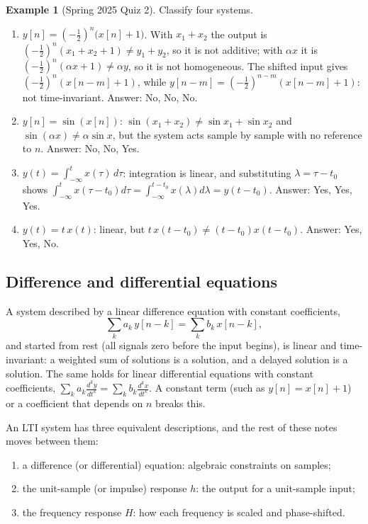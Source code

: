 \documentclass[11pt]{article}
\numberwithin{equation}{section}
\theoremstyle{definition}
\newtheorem{example}{Example}[section]
\theoremstyle{remark}
\begin{document}
\begin{example}[Spring 2025 Quiz 2]
Classify four systems.
\begin{enumerate}[label=(\alph*)]
\item $y[n]=\left(-\frac12\right)^n\big(x[n]+1\big)$. With $x_1+x_2$ the output is
$\left(-\frac12\right)^n(x_1+x_2+1)\neq y_1+y_2$, so it is not additive; with $\alpha x$ it is
$\left(-\frac12\right)^n(\alpha x+1)\neq\alpha y$, so it is not homogeneous. The shifted input gives
$\left(-\frac12\right)^n(x[n-m]+1)$, while $y[n-m]=\left(-\frac12\right)^{n-m}(x[n-m]+1)$:
not time-invariant. Answer: No, No, No.
\item $y[n]=\sin(x[n])$: $\sin(x_1+x_2)\ne\sin x_1+\sin x_2$ and $\sin(\alpha x)\ne\alpha\sin x$,
but the system acts sample by sample with no reference to $n$. Answer: No, No, Yes.
\item $y(t)=\int_{-\infty}^t x(\tau)\,d\tau$: integration is linear, and substituting
$\lambda=\tau-t_0$ shows $\int_{-\infty}^t x(\tau-t_0)d\tau=\int_{-\infty}^{t-t_0}x(\lambda)d\lambda
=y(t-t_0)$. Answer: Yes, Yes, Yes.
\item $y(t)=t\,x(t)$: linear, but $t\,x(t-t_0)\ne(t-t_0)x(t-t_0)$. Answer: Yes, Yes, No.
\end{enumerate}
\end{example}

\subsection{Difference and differential equations}
A system described by a linear difference equation with constant coefficients,
\begin{equation}
\sum_{k}a_k\,y[n-k]=\sum_k b_k\,x[n-k],
\label{eq:diffeq}
\end{equation}
and started from rest (all signals zero before the input begins), is linear and time-invariant:
a weighted sum of solutions is a solution, and a delayed solution is a solution. The same holds
for linear differential equations with constant coefficients,
$\sum_k a_k \frac{d^k y}{dt^k}=\sum_k b_k\frac{d^kx}{dt^k}$.
A constant term (such as $y[n]=x[n]+1$) or a coefficient that depends on $n$ breaks this.

An LTI system has three equivalent descriptions, and the rest of these notes moves between them:
\begin{enumerate}
\item a difference (or differential) equation: algebraic constraints on samples;
\item the unit-sample (or impulse) response $h$: the output for a unit-sample input;
\item the frequency response $H$: how each frequency is scaled and phase-shifted.
\end{enumerate}
\end{document}
